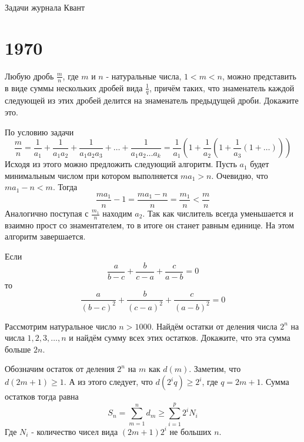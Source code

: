 \documentclass[11pt, a4paper]{template}
\begin{document}
\begin{titlepage}
  \begin{center}
	\Huge{Задачи журнала Квант}
  \end{center}
\end{titlepage}

\chapter{1970}

\begin{exercise}[M24]
Любую дробь $\frac{m}{n}$, где $m$ и $n$ - натуральные числа, $1 < m < n$, можно представить в виде суммы нескольких дробей вида $\frac{1}{q}$, причём таких, что знаменатель каждой следующей из этих дробей делится на знаменатель предыдущей дроби. Докажите это.
\end{exercise}

\begin{solution}
По условию задачи
$$
\frac{m}{n} = \frac{1}{a_{1}} + \frac{1}{a_{1}a_{2}} + \frac{1}{a_{1}a_{2}a_{3}} + \dots + \frac{1}{a_{1}a_{2}\dots a_{k}} = \frac{1}{a_{1}} \left( 1 + \frac{1}{a_{2}} \left( 1 + \frac{1}{a_{3}} (1 + \dots ) \right) \right)
$$
Исходя из этого можно предложить следующий алгоритм. Пусть $a_{1}$ будет  минимальным числом при котором выполняется $ma_{1} > n$. Очевидно, что $ma_{1} - n < m$. Тогда 
$$
\frac{ma_{1}}{n} - 1 = \frac{ma_{1}-n}{n} = \frac{m_{1}}{n} < \frac{m}{n}
$$
Аналогично поступая с $\frac{m_{1}}{n}$ находим $a_{2}$. Так как числитель всегда уменьшается и взаимно прост со знаментателем, то в итоге он станет равным единице. На этом алгоритм завершается. 
\end{solution}

\begin{exercise}[M27]
Если
$$
\frac{a}{b-c} + \frac{b}{c-a} + \frac{c}{a-b} = 0
$$
то
$$
\frac{a}{(b-c)^{2}} + \frac{b}{(c-a)^{2}} + \frac{c}{(a-b)^{2}} = 0
$$
\end{exercise}

\begin{exercise}[M33]
Рассмотрим натуральное число $n > 1000$. Найдём остатки от деления числа $2^{n}$ на числа $1, 2, 3, \dots, n$ и найдём сумму всех этих остатков. Докажите, что эта сумма больше $2n$.
\end{exercise}

\begin{solution}
Обозначим остаток от деления $2^{n}$ на $m$ как $d(m)$. Заметим, что $d(2m + 1) \geqslant 1$. А из этого следует, что $d(2^{i}q) \geqslant 2^{i}$, где $q = 2m+1$. Сумма остатков тогда равна
$$
S_{n} = \sum_{m = 1}^{n} d_{m} \geqslant \sum_{i=1}^{p} 2^{i} N_{i} 
$$
Где $N_{i}$ - количество чисел вида $(2m + 1)2^{i}$ не больших $n$.
\end{solution}
\end{document}
